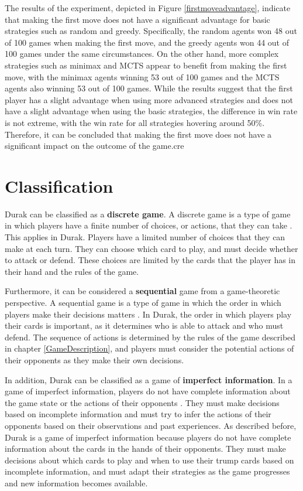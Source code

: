 The results of the experiment, depicted in Figure \ref{firstmoveadvantage}, indicate that making the first move does not have a significant advantage for basic strategies such as random and greedy. Specifically, the random agents won 48 out of 100 games when making the first move, and the greedy agents won 44 out of 100 games under the same circumstances. On the other hand, more complex strategies such as minimax and MCTS appear to benefit from making the first move, with the minimax agents winning 53 out of 100 games and the MCTS agents also winning 53 out of 100 games. While the results suggest that the first player has a slight advantage when using more advanced strategies and does not have a slight advantage when using the basic strategies, the difference in win rate is not extreme, with the win rate for all strategies hovering around 50\%. Therefore, it can be concluded that making the first move does not have a significant impact on the outcome of the game.cre

\section{Classification}

Durak can be classified as a \textbf{discrete game}. A discrete game is a type of game in which players have a finite number of choices, or actions, that they can take \citep{Gametheory4}. This applies in Durak. Players have a limited number of choices that they can make at each turn. They can choose which card to play, and must decide whether to attack or defend. These choices are limited by the cards that the player has in their hand and the rules of the game. 

Furthermore, it can be considered a \textbf{sequential} game from a game-theoretic perspective. A sequential game is a type of game in which the order in which players make their decisions matters \citep{Gametheory4}. In Durak, the order in which players play their cards is important, as it determines who is able to attack and who must defend. The sequence of actions is determined by the rules of the game described in chapter \ref{GameDescription}, and players must consider the potential actions of their opponents as they make their own decisions. 

In addition, Durak can be classified as a game of \textbf{imperfect information}. In a game of imperfect information, players do not have complete information about the game state or the actions of their opponents \citep{Gametheory4}. They must make decisions based on incomplete information and must try to infer the actions of their opponents based on their observations and past experiences. As described before, Durak is a game of imperfect information because players do not have complete information about the cards in the hands of their opponents. They must make decisions about which cards to play and when to use their trump cards based on incomplete information, and must adapt their strategies as the game progresses and new information becomes available.

